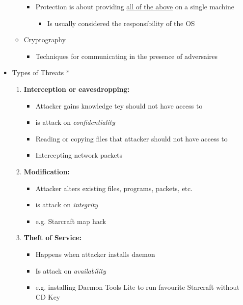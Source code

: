 \documentclass[12pt]{article}
\begin{document}
\begin{itemize}
\begin{itemize}
\begin{itemize}
            \item Protection is about providing \underline{all of the above} on
            a single machine
            \begin{itemize}
                \item Is usually considered the responsibility of the OS
            \end{itemize}
        \end{itemize}
        \item Cryptography
        \begin{itemize}
            \item Techniques for communicating in the presence of adversaires
        \end{itemize}
    \end{itemize}
    \item Types of Threats *
    \begin{enumerate}[1.]
        \item \textbf{Interception or eavesdropping:}
        \begin{itemize}
            \item Attacker gains knowledge tey should not have access to
            \item is attack on \textit{confidentiality}
            \item Reading or copying files that attacker should not have access to
            \item Intercepting network packets
        \end{itemize}
        \item \textbf{Modification:}
        \begin{itemize}
            \item Attacker alters existing files, programs, packets, etc.
            \item is attack on \textit{integrity}
            \item e.g. Starcraft map hack
        \end{itemize}
        \item \textbf{Theft of Service:}
        \begin{itemize}
            \item Happens when attacker installs daemon
            \item Is attack on \textit{availability}
            \item e.g. installing Daemon Tools Lite to run favourite Starcraft
            without CD Key
        \end{itemize}

\end{enumerate}
\end{itemize}
\end{document}
